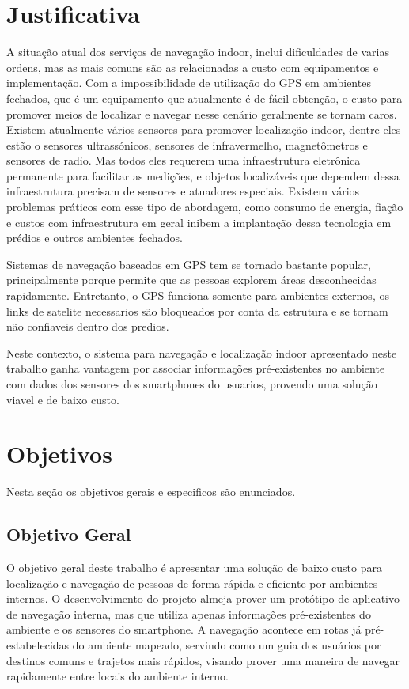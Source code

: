 \section{Justificativa}
A situação atual dos serviços de navegação indoor, inclui dificuldades de varias ordens, mas as mais comuns são as relacionadas a custo com equipamentos e implementação. Com a impossibilidade de utilização do GPS em ambientes fechados, que é um equipamento que atualmente é de fácil obtenção, o custo para promover meios de localizar e navegar nesse cenário geralmente se tornam caros. Existem atualmente vários sensores para promover localização indoor, dentre eles estão o sensores ultrassónicos, sensores de infravermelho, magnetômetros e sensores de radio. Mas todos eles requerem uma infraestrutura eletrônica permanente para facilitar as medições, e objetos localizáveis que dependem dessa infraestrutura precisam de sensores e atuadores especiais. Existem vários problemas práticos com esse tipo de abordagem, como consumo de energia, fiação e custos com infraestrutura em geral inibem a implantação dessa tecnologia em prédios e outros ambientes fechados.

Sistemas de navegação baseados em GPS tem se tornado bastante popular, principalmente porque permite que as pessoas explorem áreas desconhecidas rapidamente. Entretanto, o GPS funciona somente para ambientes externos, os links de satelite necessarios são bloqueados por conta da estrutura e se tornam não confiaveis dentro dos predios.

Neste contexto, o sistema para navegação e localização indoor apresentado neste trabalho ganha vantagem por associar informações pré-existentes no ambiente com dados dos sensores dos smartphones do usuarios, provendo uma solução viavel e de baixo custo.



\section{Objetivos}
Nesta seção os objetivos gerais e especificos são enunciados.
\subsection{Objetivo Geral}
O objetivo geral deste trabalho é apresentar uma solução de baixo custo para localização e navegação de pessoas de forma rápida e eficiente por ambientes internos. O desenvolvimento do projeto almeja prover um protótipo de aplicativo de navegação interna, mas que utiliza apenas informações pré-existentes do ambiente e os sensores do smartphone. A navegação acontece em rotas já pré-estabelecidas do ambiente mapeado, servindo como um guia dos usuários por destinos comuns e trajetos mais rápidos, visando prover uma maneira de navegar rapidamente entre locais do ambiente interno.



